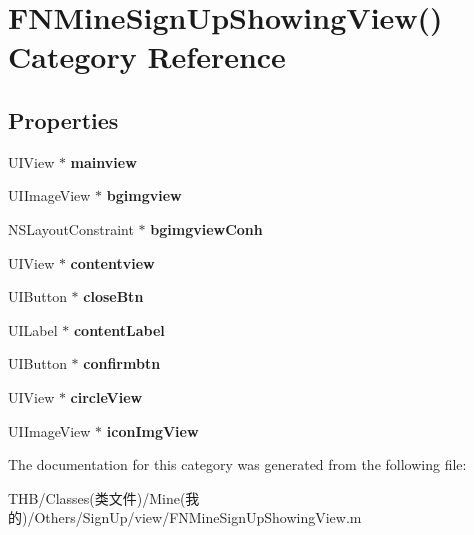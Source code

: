 \hypertarget{category_f_n_mine_sign_up_showing_view_07_08}{}\section{F\+N\+Mine\+Sign\+Up\+Showing\+View() Category Reference}
\label{category_f_n_mine_sign_up_showing_view_07_08}
\subsection*{Properties}
\begin{DoxyCompactItemize}
\item 
\mbox{\label{category_f_n_mine_sign_up_showing_view_07_08_a278ec9acec8c99db1843425a349e039b}} 
U\+I\+View $\ast$ {\bfseries mainview}
\item 
\mbox{\label{category_f_n_mine_sign_up_showing_view_07_08_a4c2572cfcc62b56e285ab79e6f91ed0d}} 
U\+I\+Image\+View $\ast$ {\bfseries bgimgview}
\item 
\mbox{\label{category_f_n_mine_sign_up_showing_view_07_08_a1eacaaf77f194e08e5b9fd0c9beb4def}} 
N\+S\+Layout\+Constraint $\ast$ {\bfseries bgimgview\+Conh}
\item 
\mbox{\label{category_f_n_mine_sign_up_showing_view_07_08_a01b8a720fc1d8ee99196a86bd490c3ec}} 
U\+I\+View $\ast$ {\bfseries contentview}
\item 
\mbox{\label{category_f_n_mine_sign_up_showing_view_07_08_ad25c255ad6c10ee83167f1a3698b1784}} 
U\+I\+Button $\ast$ {\bfseries close\+Btn}
\item 
\mbox{\label{category_f_n_mine_sign_up_showing_view_07_08_a7ceaf50354bec3d870c8cdbc2bb3950c}} 
U\+I\+Label $\ast$ {\bfseries content\+Label}
\item 
\mbox{\label{category_f_n_mine_sign_up_showing_view_07_08_a6762abd92a2121edc67921cf7f1d7d63}} 
U\+I\+Button $\ast$ {\bfseries confirmbtn}
\item 
\mbox{\label{category_f_n_mine_sign_up_showing_view_07_08_a219c1abb247659e94adb3a4fe260d7f8}} 
U\+I\+View $\ast$ {\bfseries circle\+View}
\item 
\mbox{\label{category_f_n_mine_sign_up_showing_view_07_08_a1fe9f54b69bff4b92f17f2acc95ddf01}} 
U\+I\+Image\+View $\ast$ {\bfseries icon\+Img\+View}
\end{DoxyCompactItemize}


The documentation for this category was generated from the following file\+:\begin{DoxyCompactItemize}
\item 
T\+H\+B/\+Classes(类文件)/\+Mine(我的)/\+Others/\+Sign\+Up/view/F\+N\+Mine\+Sign\+Up\+Showing\+View.\+m\end{DoxyCompactItemize}
